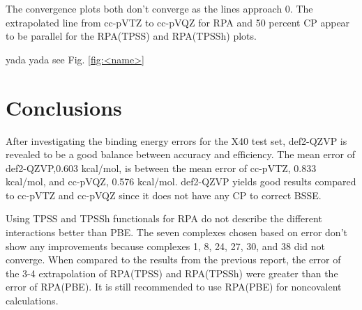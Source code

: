 \documentclass[11pt]{article}
\newcommand{\brian}[1]{{\color{orange} #1}}
\begin{document}
The convergence plots both don't converge as the lines approach 0. The
extrapolated line from cc-pVTZ to cc-pVQZ for RPA and 50 percent CP
appear to be parallel for the RPA(TPSS) and RPA(TPSSh) plots.

\brian{yada yada see Fig. \ref{fig:<name>}}




\section{Conclusions}

After investigating the binding energy errors for the X40 test set,
def2-QZVP is revealed to be a good balance between accuracy and
efficiency. The mean error of def2-QZVP,0.603 kcal/mol, is between the
mean error of cc-pVTZ, 0.833 kcal/mol, and cc-pVQZ, 0.576 kcal/mol.
def2-QZVP yields good results compared to cc-pVTZ and cc-pVQZ since it
does not have any CP to correct BSSE.

Using TPSS and TPSSh functionals for RPA do not describe the different
interactions better than PBE. The seven complexes chosen based on error
don't show any improvements because complexes 1, 8, 24, 27, 30, and 38
did not converge. When compared to the results from the previous report,
the error of the 3-4 extrapolation of RPA(TPSS) and RPA(TPSSh) were
greater than the error of RPA(PBE). It is still recommended to use
RPA(PBE) for noncovalent calculations.


\printbibliography
\end{document}
